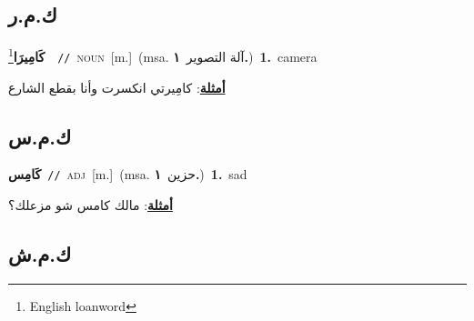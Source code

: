 \documentclass[10pt,a4paper,twoside]{article} %
\begin{document}
\begin{multicols}{2}
\vspace{-3mm}
\subsection*{\color{blue}\foreignlanguage{arabic}{ك.م.ر}\color{blue}{ (ntws)}} 

{\setlength\topsep{0pt}\textbf{\foreignlanguage{arabic}{كَامِيرَا}}\footnote{English loanword}\ \ {\color{gray}\texttt{//}\color{black}}\ \textsc{noun}\ [m.]\ \color{gray}(msa. \foreignlanguage{arabic}{آلة التصوير}~\foreignlanguage{arabic}{\textbf{١.}})\color{black}\ \textbf{1.}~camera\  \begin{flushright}\color{gray}\foreignlanguage{arabic}{\textbf{\underline{\foreignlanguage{arabic}{أمثلة}}}: كامِيرتي انكسرت وأنا بقطع الشارع}\end{flushright}\color{black}} \vspace{2mm}

\vspace{-3mm}
\subsection*{\color{blue}\foreignlanguage{arabic}{ك.م.س}\color{blue}{}} 

{\setlength\topsep{0pt}\textbf{\foreignlanguage{arabic}{كَامِس}}\ {\color{gray}\texttt{//}\color{black}}\ \textsc{adj}\ [m.]\ \color{gray}(msa. \foreignlanguage{arabic}{حزين}~\foreignlanguage{arabic}{\textbf{١.}})\color{black}\ \textbf{1.}~sad\  \begin{flushright}\color{gray}\foreignlanguage{arabic}{\textbf{\underline{\foreignlanguage{arabic}{أمثلة}}}: مالك كامس شو مزعلك؟}\end{flushright}\color{black}} \vspace{2mm}

\vspace{-3mm}
\subsection*{\color{blue}\foreignlanguage{arabic}{ك.م.ش}\color{blue}{}} 


\end{multicols}
\end{document}
